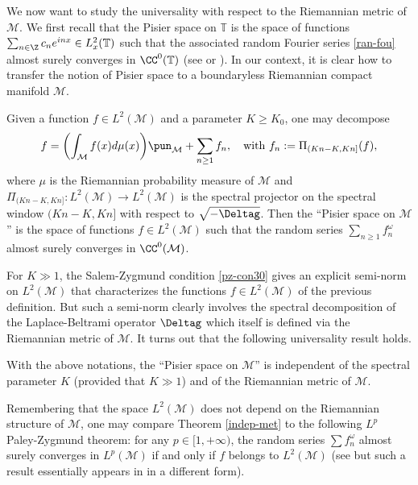 We now want to study the universality with respect to the Riemannian metric of $\mathcal{M}$.
We first recall that the Pisier space on $\mathbb{T}$ is the space of functions $\sum_{n\in \Z}c_n e^{inx}\in L_x^2(\mathbb{T})$ such that the associated random Fourier series \eqref{ran-fou} almost surely converges in $\CC^0(\mathbb{T})$
(see \cite[p.\,2]{pisier1977} or \cite[Ch.\,6]{queff2}). In our context, it is clear how to transfer the notion of Pisier space to a boundaryless Riemannian compact manifold $\mathcal{M}$.
\begin{defi}
Given a function $f\in L^2(\mathcal{M})$ and a parameter $K\geq K_0$, one may decompose
\begin{equation*}
f=\biggl(\int_{\mathcal{M}}f(x)d\mu(x)\biggr)\pun_{\mathcal{M}}+\sum_{n\geq 1} f_n, \quad \text{with } f_n:=\Pi_{(Kn-K,Kn]}(f),
\end{equation*}
where $\mu$ is the Riemannian probability measure of $\mathcal{M}$ and $\Pi_{(Kn-K,Kn]}:L^2(\mathcal{M})\to L^2(\mathcal{M})$ is the spectral projector on the spectral window $(Kn-K,Kn]$ with respect to $\sqrt{-\Deltag}$. Then the ``Pisier space on $\mathcal{M}$'' is the space of functions $f\in L^2(\mathcal{M})$ such that the random series $\sum_{n\geq 1} f_n^{\omega}$ almost surely converges in $\CC^0(\mathcal{M})$.
\end{defi}
For $K\gg 1$, the Salem-Zygmund condition \eqref{pz-con30} gives an explicit semi-norm on $L^2(\mathcal{M})$ that characterizes the functions $f\in L^2(\mathcal{M})$ of the previous definition. But such a semi-norm clearly involves the spectral decomposition of the Laplace-Beltrami operator $\Deltag$ which itself is defined via the Riemannian metric of $\mathcal{M}$.
It turns out that the following universality result holds.

\begin{theo}\label{indep-met}
With the above notations, the ``Pisier space on $\mathcal{M}$'' is independent of the spectral parameter $K$ (provided that $K\gg 1$) and of the Riemannian metric of $\mathcal{M}$.
\end{theo}
Remembering that the space $L^2(\mathcal{M})$
does not depend on the Riemannian structure of $\mathcal{M}$, one may compare Theorem \ref{indep-met} to the following $L^p$ Paley-Zygmund theorem: for any $p\in [1,+\infty)$, the random series $\sum f_n^\omega$ almost surely converges in $L^p(\mathcal{M})$ if and only if $f$ belongs to $L^2(\mathcal{M})$ (see \cite[Th.\,2.3]{imek-aif} but such a result essentially appears in \cite{burq-lebeau} in a different form).

